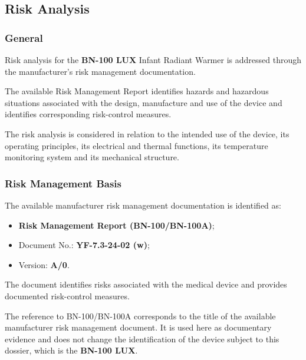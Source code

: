 
\hypertarget{p3-4-1}{}

\subsection{Risk Analysis}

\subsubsection{General}

Risk analysis for the \textbf{BN-100 LUX} Infant Radiant Warmer is addressed
through the manufacturer's risk management documentation.

The available Risk Management Report identifies hazards and hazardous
situations associated with the design, manufacture and use of the device and
identifies corresponding risk-control measures.

The risk analysis is considered in relation to the intended use of the
device, its operating principles, its electrical and thermal functions, its
temperature monitoring system and its mechanical structure.

\subsubsection{Risk Management Basis}

The available manufacturer risk management documentation is identified as:

\begin{itemize}

    \item \textbf{Risk Management Report (BN-100/BN-100A)};

    \item Document No.: \textbf{YF-7.3-24-02 (w)};

    \item Version: \textbf{A/0}.

\end{itemize}

The document identifies risks associated with the medical device and
provides documented risk-control measures.

The reference to BN-100/BN-100A corresponds to the title of the available
manufacturer risk management document. It is used here as documentary
evidence and does not change the identification of the device subject to
this dossier, which is the \textbf{BN-100 LUX}.

